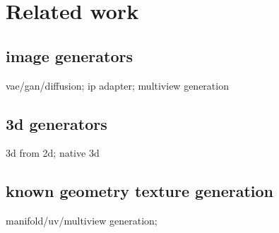 \section{Related work}

\subsection{image generators}
vae/gan/diffusion; ip adapter; multiview generation

\subsection{3d generators}
3d from 2d; native 3d

\subsection{known geometry texture generation}
manifold/uv/multiview generation; 